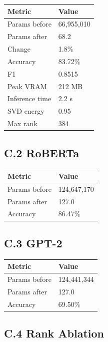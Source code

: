 \begin{table}[H]
\centering
\small
\begin{tabular}{ll}
\toprule
\textbf{Metric} & \textbf{Value} \\
\midrule
Params before & 66,955,010 \\
Params after & 68.2 \\
Change & 1.8\% \\
Accuracy & 83.72\% \\
F1 & 0.8515 \\
Peak VRAM & 212 MB \\
Inference time & 2.2 s \\
SVD energy & 0.95 \\
Max rank & 384 \\
\bottomrule
\end{tabular}
\end{table}

\subsection{C.2 RoBERTa}

\begin{table}[H]
\centering
\small
\begin{tabular}{ll}
\toprule
\textbf{Metric} & \textbf{Value} \\
\midrule
Params before & 124,647,170 \\
Params after & 127.0 \\
Accuracy & 86.47\% \\
\bottomrule
\end{tabular}
\end{table}

\subsection{C.3 GPT-2}

\begin{table}[H]
\centering
\small
\begin{tabular}{ll}
\toprule
\textbf{Metric} & \textbf{Value} \\
\midrule
Params before & 124,441,344 \\
Params after & 127.0 \\
Accuracy & 69.50\% \\
\bottomrule
\end{tabular}
\end{table}

\subsection{C.4 Rank Ablation}


